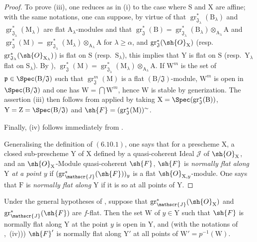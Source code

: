 \begin{proof}
To prove (iii), one reduces as in (i) to the case where $\mathrm{S}$ and $\mathrm{X}$ are affine; with the same notations, one can suppose, by virtue of  that $\operatorname{gr}^*_{\mathfrak{J}_\lambda}(\mathrm{B}_\lambda)$ and $\operatorname{gr}^*_{\mathfrak{J}_\lambda}(\mathrm{M}_\lambda)$ are flat $\mathrm{A}_\lambda$-modules and that $\operatorname{gr}^*_\mathfrak{J}(\mathrm{B})=\operatorname{gr}^*_{\mathfrak{J}_\lambda}(\mathrm{B}_\lambda)\otimes_{\mathrm{A}_\lambda}\mathrm{A}$ and $\operatorname{gr}^*_\mathfrak{J}(\mathrm{M})=\operatorname{gr}^*_{\mathfrak{J}_\lambda}(\mathrm{M}_\lambda)\otimes_{\mathrm{A}_\lambda}\mathrm{A}$ for $\lambda\geqslant\alpha$, and $\operatorname{gr}^*_\mathfrak{J}(\sh{O}_\mathrm{X})$ (resp.\ $\operatorname{gr}^*_{\mathfrak{J}_\lambda}(\sh{O}_{\mathrm{X}_\lambda})$) is flat on $\mathrm{S}$ (resp.\ $\mathrm{S}_\lambda$), this implies that $\mathrm{Y}$ is flat on $\mathrm{S}$ (resp.\ $\mathrm{Y}_\lambda$ flat on $\mathrm{S}_\lambda$). By ), $\operatorname{gr}^*_\mathfrak{J}(\mathrm{M})=\operatorname{gr}^*_{\mathfrak{J}_\lambda}(\mathrm{M}_\lambda)\otimes_{\mathrm{A}_\lambda}\mathrm{A}$. If $\mathrm{W}^m$ is the set of $\mathfrak{p}\in\Spec(\mathrm{B}/\mathfrak{J})$ such that $\operatorname{gr}^m_\mathfrak{J}(\mathrm{M})$ is a flat $(\mathrm{B}/\mathfrak{J})$-module, $\mathrm{W}^m$ is open in $\Spec(\mathrm{B}/\mathfrak{J})$  and one has $\mathrm{W}=\bigcap\mathrm{W}^m$, hence $\mathrm{W}$ is stable by generization. The assertion (iii) then follows from  applied by taking $\mathrm{X}=\Spec(\operatorname{gr}^*_\mathfrak{J}(\mathrm{B}))$, $\mathrm{Y}=\mathrm{Z}=\Spec(\mathrm{B}/\mathfrak{J})$ and $\sh{F}=(\operatorname{gr}^*_\mathfrak{J}(\mathrm{M}))^\sim$.

Finally, (iv) follows immediately from .

Generalising the definition of $(6.10.1)$, one says that for a prescheme $\mathrm{X}$, a closed sub-prescheme $\mathrm{Y}$ of $\mathrm{X}$ defined by a quasi-coherent Ideal $\mathscr{J}$ of $\sh{O}_\mathrm{X}$, and an $\sh{O}_\mathrm{X}$-Module quasi-coherent $\sh{F}$, $\sh{F}$ is \emph{normally flat along $\mathrm{Y}$ at a point $y$} if $(\operatorname{gr}^*_\mathscr{J}(\sh{F}))_y$ is a flat $\sh{O}_{\mathrm{X},y}$-module. One says that $\mathrm{F}$ is \emph{normally flat along $\mathrm{Y}$} if it is so at all points of $\mathrm{Y}$.
\end{proof}

\begin{corollary}[11.3.5]
\label{IV.11.3.5}
Under the general hypotheses of , suppose that $\operatorname{gr}^*_\mathscr{J}(\sh{O}_\mathrm{X})$ and $\operatorname{gr}^*_\mathscr{J}(\sh{F})$ are $f$-flat. Then the set $\mathrm{W}$ of $y\in\mathrm{Y}$ such that $\sh{F}$ is normally flat along $\mathrm{Y}$ at the point $y$ is open in $\mathrm{Y}$, and (with the notations of ,~(iv))) $\sh{F}'$ is normally flat along $\mathrm{Y}'$ at all points of $\mathrm{W}'=p^{-1}(\mathrm{W})$.
\end{corollary}

